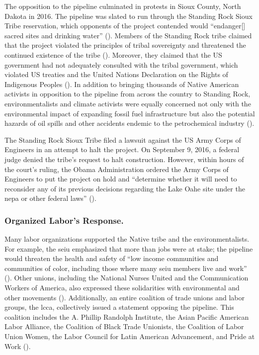 \documentclass[12pt]{article}
\begin{document}
The opposition to the pipeline culminated in protests in Sioux County, North Dakota in 2016. The pipeline was slated to run through the Standing Rock Sioux Tribe reservation, which opponents of the project contended would “endanger[] sacred sites and drinking water” (\cite{sahaFiveThingsKnow2016}). Members of the Standing Rock tribe claimed that the project violated the principles of tribal sovereignty and threatened the continued existence of the tribe (\cite{massieUnderstandDakotaAccess2016}). Moreover, they claimed that the US government had not adequately consulted with the tribal government, which violated US treaties and the United Nations Declaration on the Rights of Indigenous Peoples (\cite{sahaFiveThingsKnow2016}). In addition to bringing thousands of Native American activists in opposition to the pipeline from across the country to Standing Rock, environmentalists and climate activists were equally concerned not only with the environmental impact of expanding fossil fuel infrastructure but also the potential hazards of oil spills  and other accidents endemic to the petrochemical industry (\cite{sahaFiveThingsKnow2016}). 

The Standing Rock Sioux Tribe filed a lawsuit against the US Army Corps of Engineers in an attempt to halt the project. On September 9, 2016, a federal judge denied the tribe’s request to halt construction. However, within hours of the court’s ruling, the Obama Administration ordered the Army Corps of Engineers to put the project on hold and “determine whether it will need to reconsider any of its previous decisions regarding the Lake Oahe site under the \acrfull{nepa} or other federal laws” (\cite{officeofpublicaffairsJointStatementDepartment2016}). 

\subsubsection{Organized Labor's Response.}

Many labor organizations supported the Native tribe and the environmentalists. For example, the \acrfull{seiu} emphasized that more than jobs were at stake; the pipeline would threaten the health and safety of “low income communities and communities of color, including those where many \acrshort{seiu} members live and work” (\cite{nlfUnionsWeighDakota2016}). Other unions, including the National Nurses United and the Communication Workers of America, also expressed these solidarities with environmental and other movements (\cite{nlfUnionsWeighDakota2016}). Additionally, an entire coalition of trade unions and labor groups, the \acrfull{lcca}, collectively issued a statement opposing the pipeline. This coalition includes the A. Phillip Randolph Institute, the Asian Pacific American Labor Alliance, the Coalition of Black Trade Unionists, the Coalition of Labor Union Women, the Labor Council for Latin American Advancement, and Pride at Work (\cite{apalaAFLCIOConstituencyGroups2016}).
\end{document}
